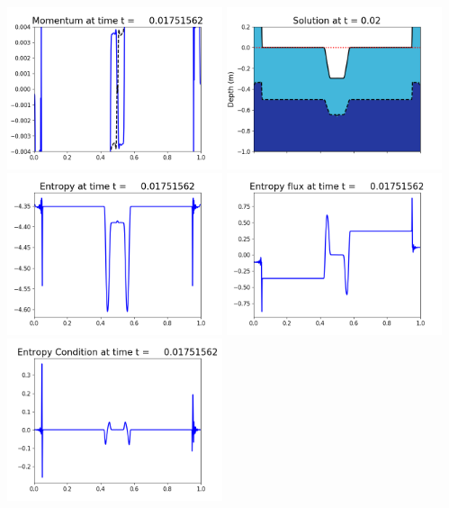 \documentclass[11pt]{article}
\begin{document}
\vskip 10pt 
\includegraphics[width=0.475\textwidth]{frame0041fig1003.png}
\includegraphics[width=0.475\textwidth]{frame0041fig1006.png}
\vskip 10pt 
\includegraphics[width=0.475\textwidth]{frame0041fig1007.png}
\includegraphics[width=0.475\textwidth]{frame0041fig1008.png}
\vskip 10pt 
\includegraphics[width=0.475\textwidth]{frame0041fig1009.png}
\end{document}
